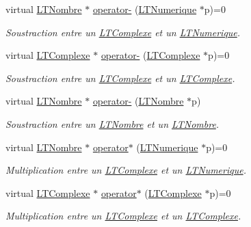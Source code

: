 \begin{DoxyCompactItemize}
virtual \hyperlink{class_l_t_nombre}{L\+T\+Nombre} $\ast$ \hyperlink{class_l_t_nombre_ade4345e2555976c45c433fcc6d91e417}{operator-\/} (\hyperlink{class_l_t_numerique}{L\+T\+Numerique} $\ast$p)=0
\begin{DoxyCompactList}\small\item\em Soustraction entre un \hyperlink{class_l_t_complexe}{L\+T\+Complexe} et un \hyperlink{class_l_t_numerique}{L\+T\+Numerique}. \end{DoxyCompactList}\item 
virtual \hyperlink{class_l_t_complexe}{L\+T\+Complexe} $\ast$ \hyperlink{class_l_t_nombre_a60d335475d7b623f6f8ff513494e6572}{operator-\/} (\hyperlink{class_l_t_complexe}{L\+T\+Complexe} $\ast$p)=0
\begin{DoxyCompactList}\small\item\em Soustraction entre un \hyperlink{class_l_t_complexe}{L\+T\+Complexe} et un \hyperlink{class_l_t_complexe}{L\+T\+Complexe}. \end{DoxyCompactList}\item 
virtual \hyperlink{class_l_t_nombre}{L\+T\+Nombre} $\ast$ \hyperlink{class_l_t_nombre_a6c890ac42ae18b6ef66b12bad91e350e}{operator-\/} (\hyperlink{class_l_t_nombre}{L\+T\+Nombre} $\ast$p)
\begin{DoxyCompactList}\small\item\em Soustraction entre un \hyperlink{class_l_t_nombre}{L\+T\+Nombre} et un \hyperlink{class_l_t_nombre}{L\+T\+Nombre}. \end{DoxyCompactList}\item 
virtual \hyperlink{class_l_t_nombre}{L\+T\+Nombre} $\ast$ \hyperlink{class_l_t_nombre_af77bf71cb71f2409ee78ae8421958bfe}{operator$\ast$} (\hyperlink{class_l_t_numerique}{L\+T\+Numerique} $\ast$p)=0
\begin{DoxyCompactList}\small\item\em Multiplication entre un \hyperlink{class_l_t_complexe}{L\+T\+Complexe} et un \hyperlink{class_l_t_numerique}{L\+T\+Numerique}. \end{DoxyCompactList}\item 
virtual \hyperlink{class_l_t_complexe}{L\+T\+Complexe} $\ast$ \hyperlink{class_l_t_nombre_a90743859f0a4197a698d44be68d5c47b}{operator$\ast$} (\hyperlink{class_l_t_complexe}{L\+T\+Complexe} $\ast$p)=0
\begin{DoxyCompactList}\small\item\em Multiplication entre un \hyperlink{class_l_t_complexe}{L\+T\+Complexe} et un \hyperlink{class_l_t_complexe}{L\+T\+Complexe}. \end{DoxyCompactList}\item 

\end{DoxyCompactItemize}
